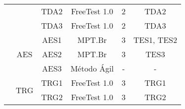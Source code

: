 \begin{table}[H]
{\begin{tabular}{|c|c|c|c|c|c|}
                                                                                      & \multicolumn{1}{l|}{}                     & \multicolumn{1}{l|}{TDA2} & FreeTest 1.0                     & 2                                                                               & TDA2                                                                                 \\ \cline{3-6} 
                                                                                      & \multicolumn{1}{l|}{}                     & \multicolumn{1}{l|}{TDA3} & FreeTest 1.0                     & 2                                                                               & TDA3                                                                                 \\ \cline{2-6} 
                                                                                      & \multirow{3}{*}{AES}                      & AES1                      & MPT.Br                           & 3                                                                               & TES1, TES2                                                                           \\ \cline{3-6} 
                                                                                      &                                           & AES2                      & MPT.Br                           & 3                                                                               & TES3                                                                                 \\ \cline{3-6} 
                                                                                      &                                           & AES3                      & Método Ágil                      & -                                                                               & -                                                                                    \\ \cline{2-6} 
                                                                                      & \multicolumn{1}{l|}{\multirow{4}{*}{TRG}} & TRG1                      & FreeTest 1.0                     & 3                                                                               & TRG1                                                                                 \\ \cline{3-6} 
                                                                                      & \multicolumn{1}{l|}{}                     & TRG2                      & FreeTest 1.0                     & 3                                                                               & TRG2                                                                                 \\ \cline{3-6} 

\end{tabular}}
\end{table}
